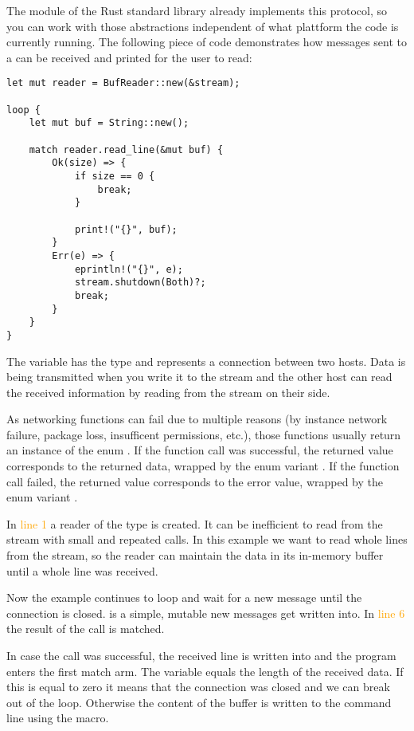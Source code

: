The module  of the Rust standard library already implements this protocol, so you can work with those
abstractions independent of what plattform the code is currently running. The following piece of code demonstrates
how messages sent to a  can be received and printed for the user to read:

\begin{verbatim}
let mut reader = BufReader::new(&stream);

loop {
    let mut buf = String::new();

    match reader.read_line(&mut buf) {
        Ok(size) => {
            if size == 0 {
                break;
            }

            print!("{}", buf);
        }
        Err(e) => {
            eprintln!("{}", e);
            stream.shutdown(Both)?;
            break;
        }
    }
}
\end{verbatim}

The variable  has the type  and represents a connection between two hosts. Data is being
transmitted when you write it to the stream and the other host can read the received information by reading from the
stream on their side.

As networking functions can fail due to multiple reasons (by instance network failure, package loss, insufficent
permissions, etc.), those functions usually return an instance of the enum . If the function
call was successful, the returned value corresponds to the returned data, wrapped by the enum variant . If
the function call failed, the returned value corresponds to the error value, wrapped by the enum variant
.

In \textcolor{orange}{line 1} a reader of the type  is created. It can be inefficient to read
from the stream with small and repeated calls. In this example we want to read whole lines from the stream, so the
reader can maintain the data in its in-memory buffer until a whole line was received.

Now the example continues to loop and wait for a new message until the connection is closed.  is a simple,
mutable  new messages get written into. In \textcolor{orange}{line 6} the result of the call
 is matched.

In case the call was successful, the received line is written into  and the program enters the first match
arm. The variable  equals the length of the received data. If this is equal to zero it means that the
connection was closed and we can break out of the loop. Otherwise the content of the buffer is written to the command
line using the  macro.

